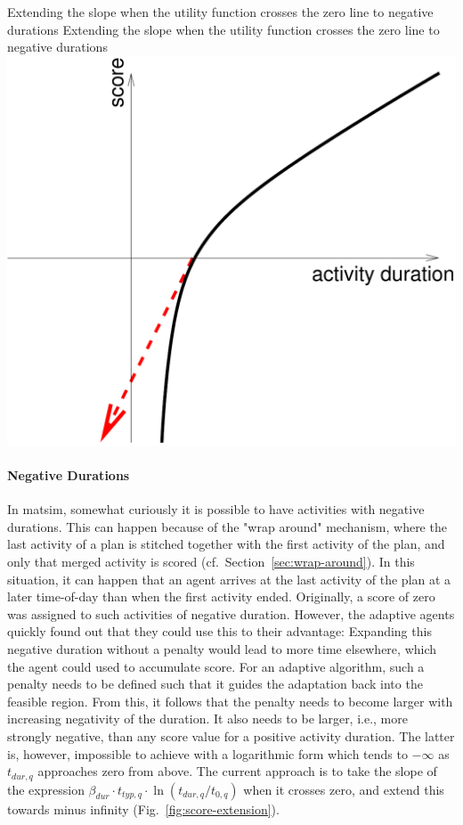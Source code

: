 \createfigure%
{Extending the slope when the utility function crosses the zero line to negative durations}%
{Extending the slope when the utility function crosses the zero line to negative durations}%
{\label{tab:score-extension}}%
{\includegraphics[width=0.4\hsize,trim=0 0 0 0,clip]{using/figures/score-extension}}%
{}

\paragraph*{Negative Durations}

In \gls{matsim}, somewhat curiously it is possible to have activities with negative durations. This can happen because of the "wrap around" mechanism, where the last activity of a plan is stitched together with the first activity of the plan, and only that merged activity is scored (cf.~Section~\ref{sec:wrap-around}). 
In this situation,
it can happen that an agent arrives at the last activity of the plan at a later time-of-day than when the first activity ended.  Originally, a score of zero was assigned to such activities of negative duration. However, the adaptive agents quickly found out that they could use this to their advantage: Expanding this negative duration without a penalty would lead to more time elsewhere, which the agent could used to accumulate score. %
%
For an adaptive \gls{algorithm}, such a penalty needs to be defined such that it guides the adaptation back into the feasible region. From this, it follows that the penalty needs to become larger with increasing negativity of the duration. It also needs to be larger, i.e., more strongly negative, than any score value for a positive activity duration.  The latter is, however, impossible to achieve with a logarithmic form which tends to $-\infty$ as $t_{dur,q}$ approaches zero from above. The current approach is to take the slope of the expression $\beta_{dur} \cdot t_{typ,q} \cdot \ln( t_{dur,q} / t_{0,q} )$ when it crosses zero, and extend this towards minus infinity (Fig.~\ref{fig:score-extension}).

